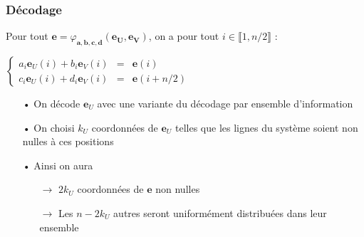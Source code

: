 \documentclass[10pt,a4paper]{beamer}
\theoremstyle{plain}
\theoremstyle{definition}
\newcommand{\e}{\mathbf{e}}
\begin{document}
\begin{frame}
\frametitle{Décodage}

\vspace{0.15in}
\begin{block}{}
Pour tout $\mathbf{e} = \varphi_{\mathbf{a},\mathbf{b},\mathbf{c},\mathbf{d}}(\mathbf{e_U},\mathbf{e_V})$, on a pour tout $i \in \llbracket 1,n/2\rrbracket$ :

\begin{center}
$\left \{
\begin{array}{rcl}
a_i\mathbf{e}_U(i) + b_i\mathbf{e}_V(i) &=& \mathbf{e}(i) \\[0.3cm]
c_i\mathbf{e}_U(i) + d_i\mathbf{e}_V(i) &=& \mathbf{e}(i+n/2) 
\end{array}
\right.$
\end{center}
\end{block}

\vspace{0.1in}

\begin{itemize}
\item[•] On décode $\e_U$ avec une variante du décodage par ensemble d'information
\vspace{0.1in}
\item[•] On choisi $k_U$ coordonnées de $\e_U$ telles que les lignes du système soient non nulles à ces positions
\vspace{0.1in}
\item[•] Ainsi on aura
	\begin{itemize}
	\vspace{0.05in}
	\item[$\rightarrow$] $2k_U$ coordonnées de $\e$ non nulles
	\vspace{0.1in}
	\item[$\rightarrow$] Les $n-2k_U$ autres seront uniformément distribuées dans leur ensemble
	\end{itemize}
\end{itemize}

\end{frame}
\end{document}
